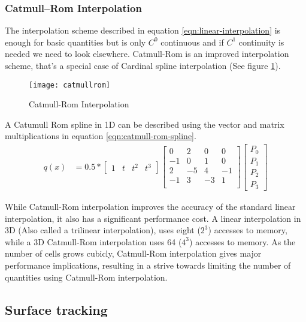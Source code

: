 \documentclass[twocolumn]{article}
\begin{document}
\subsubsection{Catmull–Rom Interpolation}
\label{sec:catmull-rom}
The interpolation scheme described in equation \ref{eqn:linear-interpolation} is enough for basic quantities but is only $C^0$ continuous and if $C^1$ continuity is needed we need to look elsewhere. Catmull-Rom is an improved interpolation scheme, that's a special case of Cardinal spline interpolation (See figure \ref{fig:catmull-rom}).
\begin{figure}[H]
  \centering
    \texttt{[image: catmullrom]}
  \caption{Catmull-Rom Interpolation}
  \label{fig:catmull-rom}
\end{figure}
A Catumull Rom spline in 1D can be described using the vector and matrix multiplications in equation \ref{eqn:catmull-rom-spline}.
\begin{equation}
\begin{split}
q(x) &= 0.5 *
    \begin{bmatrix}
        1 & t & t^2 & t^3
    \end{bmatrix}
    \begin{bmatrix}
       0 & 2 & 0 & 0 \\
      -1 & 0 & 1 & 0 \\
       2 & -5 & 4 & -1 \\
       -1 & 3 & -3 & 1 \\
    \end{bmatrix}
    \begin{bmatrix}
        P_0 \\ P_1 \\ P_2 \\ P_3
    \end{bmatrix}
\end{split}
\label{eqn:catmull-rom-spline}
\end{equation}

While Catmull-Rom interpolation improves the accuracy of the standard linear interpolation, it also has a significant performance cost. A linear interpolation in 3D (Also called a trilinear interpolation), uses eight ($2^3$) accesses to memory, while a 3D Catmull-Rom interpolation uses 64 ($4^3$) accesses to memory. As the number of cells grows cubicly, Catmull-Rom interpolation gives major performance implications, resulting in a strive towards limiting the number of quantities using Catmull-Rom interpolation.

\subsection{Surface tracking}
\end{document}

